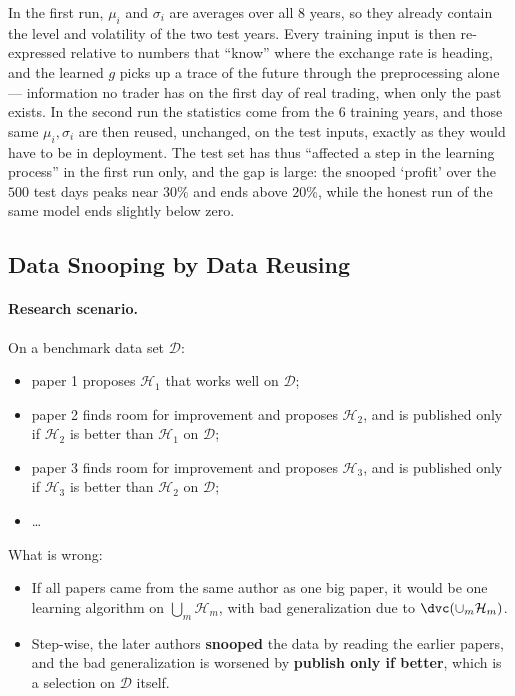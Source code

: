 In the first run, \(\mu_i\) and \(\sigma_i\) are averages over all \(8\)
years, so they already contain the level and volatility of the two test
years. Every training input is then re-expressed relative to numbers that
``know'' where the exchange rate is heading, and the learned \(g\) picks up
a trace of the future through the preprocessing alone --- information no
trader has on the first day of real trading, when only the past exists. In
the second run the statistics come from the \(6\) training years, and those
same \(\mu_i, \sigma_i\) are then reused, unchanged, on the test inputs,
exactly as they would have to be in deployment. The test set has thus
``affected a step in the learning process'' in the first run only, and the
gap is large: the snooped `profit' over the \(500\) test days peaks near
\(30\%\) and ends above \(20\%\), while the honest run of the same model ends
slightly below zero.

\subsection{Data Snooping by Data Reusing}

\paragraph{Research scenario.} On a benchmark data set \(\mathcal{D}\):
\begin{itemize}
    \item paper 1 proposes \(\mathcal{H}_1\) that works well on
        \(\mathcal{D}\);
    \item paper 2 finds room for improvement and proposes \(\mathcal{H}_2\),
        and is published only if \(\mathcal{H}_2\) is better than
        \(\mathcal{H}_1\) on \(\mathcal{D}\);
    \item paper 3 finds room for improvement and proposes \(\mathcal{H}_3\),
        and is published only if \(\mathcal{H}_3\) is better than
        \(\mathcal{H}_2\) on \(\mathcal{D}\);
    \item \ldots
\end{itemize}

What is wrong:
\begin{itemize}
    \item If all papers came from the same author as one big paper, it would
        be one learning algorithm on \(\bigcup_m \mathcal{H}_m\), with bad
        generalization due to \(\dvc(\cup_m \mathcal{H}_m)\).
    \item Step-wise, the later authors \textbf{snooped} the data by reading
        the earlier papers, and the bad generalization is worsened by
        \textbf{publish only if better}, which is a selection on
        \(\mathcal{D}\) itself.
\end{itemize}

